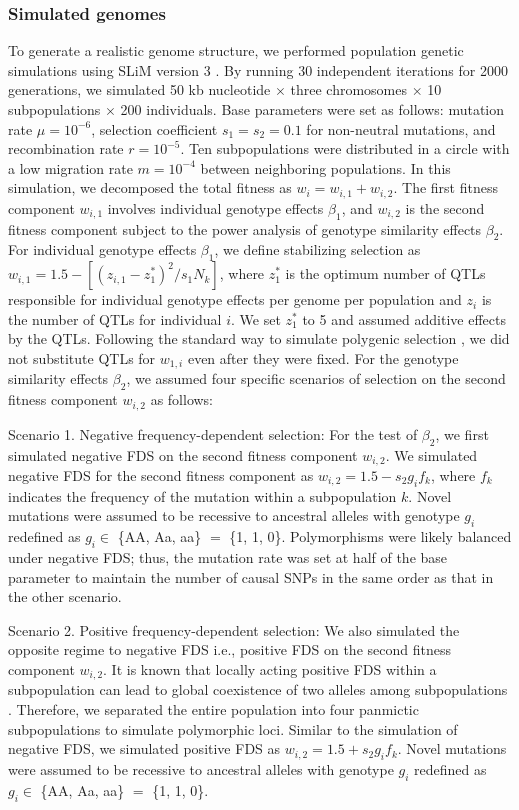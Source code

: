 \documentclass[12pt,]{article}
\begin{document}
\subsubsection*{Simulated genomes}
To generate a realistic genome structure, we performed population genetic simulations using SLiM version 3 \citep{haller_slim_2019}. By running 30 independent iterations for 2000 generations, we simulated 50 kb nucleotide $\times$ three chromosomes $\times$ 10 subpopulations $\times$ 200 individuals. Base parameters were set as follows: mutation rate $\mu = 10^{-6}$, selection coefficient $s_1=s_2=0.1$ for non-neutral mutations, and recombination rate $r=10^{-5}$. Ten subpopulations were distributed in a circle with a low migration rate $m=10^{-4}$ between neighboring populations. In this simulation, we decomposed the total fitness as $w_i = w_{i,1} + w_{i,2}$. The first fitness component $w_{i,1}$ involves individual genotype effects $\beta_1$, and $w_{i,2}$ is the second fitness component subject to the power analysis of genotype similarity effects $\beta_2$. For individual genotype effects $\beta_1$, we define stabilizing selection as $w_{i,1} = 1.5 - [(z_{i,1} - z_1^*)^2 / s_1N_k]$, where $z_1^*$ is the optimum number of QTLs responsible for individual genotype effects per genome per population and $z_i$ is the number of QTLs for individual $i$. We set $z_1^*$ to 5 and assumed additive effects by the QTLs. Following the standard way to simulate polygenic selection \citep{haller_slim_2019}, we did not substitute QTLs for $w_{1,i}$ even after they were fixed. For the genotype similarity effects $\beta_2$, we assumed four specific scenarios of selection on the second fitness component $w_{i,2}$ as follows: 

Scenario 1. Negative frequency-dependent selection: For the test of $\beta_2$, we first simulated negative FDS on the second fitness component $w_{i,2}$. We simulated negative FDS for the second fitness component as $w_{i,2} = 1.5 - s_ 2 g _if_k$, where $f_k$ indicates the frequency of the mutation within a subpopulation $k$. Novel mutations were assumed to be recessive to ancestral alleles with genotype $g_i$ redefined as $g_i \in$ \{AA, Aa, aa\} $=$ \{1, 1, 0\}. Polymorphisms were likely balanced under negative FDS; thus, the mutation rate was set at half of the base parameter to maintain the number of causal SNPs in the same order as that in the other scenario.

Scenario 2. Positive frequency-dependent selection: We also simulated the opposite regime to negative FDS i.e., positive FDS on the second fitness component $w_{i,2}$. It is known that locally acting positive FDS within a subpopulation can lead to global coexistence of two alleles among subpopulations \citep{molofsky2001coexistence}. Therefore, we separated the entire population into four panmictic subpopulations to simulate polymorphic loci. Similar to the simulation of negative FDS, we simulated positive FDS as $w_{i,2} = 1.5 + s_ 2 g _if_k$. Novel mutations were assumed to be recessive to ancestral alleles with genotype $g_i$ redefined as $g_i \in$ \{AA, Aa, aa\} $=$ \{1, 1, 0\}. 
\end{document}
